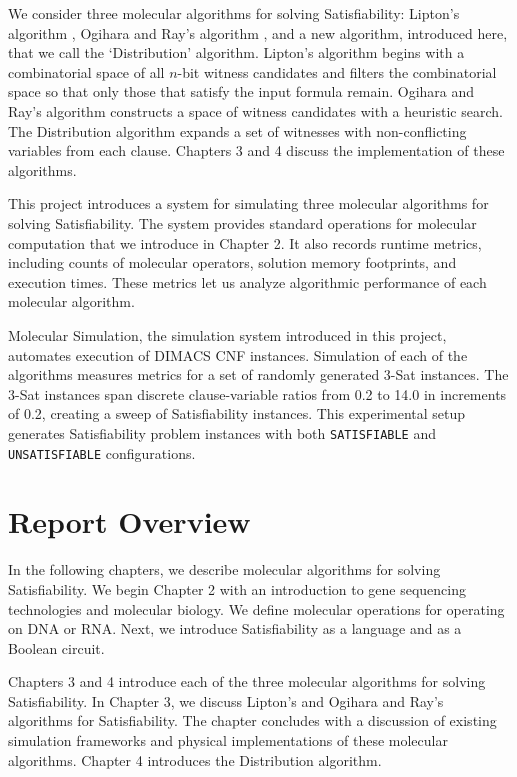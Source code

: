 We consider three molecular algorithms for solving {\sc Satisfiability}: Lipton's algorithm \cite{Lipton95usingdna}, Ogihara and Ray's algorithm \cite{Ogihara:1996:BFS:898228, Ogihara97dna-basedparallel}, and a new algorithm, introduced here, that we call the `Distribution' algorithm.  Lipton's algorithm begins with a combinatorial space of all $n$-bit witness candidates and filters the combinatorial space so that only those that satisfy the input formula remain.  Ogihara and Ray's algorithm constructs a space of witness candidates with a heuristic search.  The Distribution algorithm expands a set of witnesses with non-conflicting variables from each clause.  Chapters 3 and 4 discuss the implementation of these algorithms.

This project introduces a system for simulating three molecular algorithms for solving {\sc Satisfiability}.  The system provides standard operations for molecular computation that we introduce in Chapter 2.  It also records runtime metrics, including counts of molecular operators, solution memory footprints, and execution times.  These metrics let us analyze algorithmic performance of each molecular algorithm.

Molecular Simulation, the simulation system introduced in this project, automates execution of DIMACS CNF instances.  Simulation of each of the algorithms measures metrics for a set of randomly generated $3$-{\sc Sat} instances.  The $3$-{\sc Sat} instances span discrete clause-variable ratios from 0.2 to 14.0 in increments of 0.2, creating a sweep of {\sc Satisfiability} instances.  This experimental setup generates {\sc Satisfiability} problem instances with both \texttt{SATISFIABLE} and \texttt{UNSATISFIABLE} configurations.

\section{Report Overview}

In the following chapters, we describe molecular algorithms for solving {\sc Satisfiability}.  We begin Chapter 2 with an introduction to gene sequencing technologies and molecular biology.  We define molecular operations for operating on DNA or RNA.  Next, we introduce {\sc Satisfiability} as a language and as a Boolean circuit.

Chapters 3 and 4 introduce each of the three molecular algorithms for solving {\sc Satisfiability}.  In Chapter 3, we discuss Lipton's \cite{Lipton95usingdna, dnaComputingModels2008} and Ogihara and Ray's \cite{Ogihara:1996:BFS:898228, Ogihara97dna-basedparallel, dnaBasedImplemetation_Yoshida2000} algorithms for {\sc Satisfiability}.  The chapter concludes with a discussion of existing simulation frameworks and physical implementations of these molecular algorithms.  Chapter 4 introduces the Distribution algorithm.

